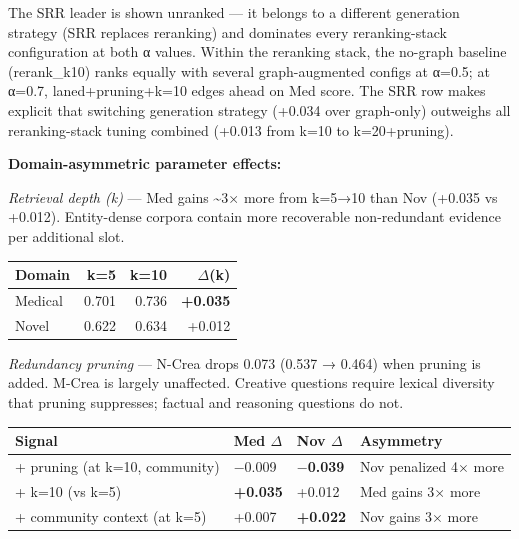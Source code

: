 \documentclass[
]{article}
\begin{document}
The SRR leader is shown unranked --- it belongs to a different
generation strategy (SRR replaces reranking) and dominates every
reranking-stack configuration at both α values. Within the reranking
stack, the no-graph baseline (rerank\_k10) ranks equally with several
graph-augmented configs at α=0.5; at α=0.7, laned+pruning+k=10 edges
ahead on Med score. The SRR row makes explicit that switching generation
strategy (+0.034 over graph-only) outweighs all reranking-stack tuning
combined (+0.013 from k=10 to k=20+pruning).

\textbf{Domain-asymmetric parameter effects:}

\emph{Retrieval depth (k)} --- Med gains \textasciitilde3× more from
k=5→10 than Nov (+0.035 vs +0.012). Entity-dense corpora contain more
recoverable non-redundant evidence per additional slot.

\begin{small}
\setlength{\tabcolsep}{4pt}
\begin{longtable}{p{1.2in}rrr}
\toprule
\textbf{Domain} & \textbf{k=5} & \textbf{k=10} & \textbf{$\Delta$(k)} \\
\midrule
\endhead
Medical & 0.701 & 0.736 & \textbf{+0.035} \\
Novel & 0.622 & 0.634 & +0.012 \\
\bottomrule
\end{longtable}
\end{small}

\emph{Redundancy pruning} --- N-Crea drops 0.073 (0.537 → 0.464) when
pruning is added. M-Crea is largely unaffected. Creative questions
require lexical diversity that pruning suppresses; factual and reasoning
questions do not.

\begin{small}
\setlength{\tabcolsep}{4pt}
\begin{longtable}{p{2.2in}p{0.8in}p{0.8in}p{2.0in}}
\toprule
\textbf{Signal} & \textbf{Med $\Delta$} & \textbf{Nov $\Delta$} & \textbf{Asymmetry} \\
\midrule
\endhead
+ pruning (at k=10, community) & $-$0.009 & \textbf{$-$0.039} & Nov penalized 4$\times$ more \\
+ k=10 (vs k=5) & \textbf{+0.035} & +0.012 & Med gains 3$\times$ more \\
+ community context (at k=5) & +0.007 & \textbf{+0.022} & Nov gains 3$\times$ more \\
\bottomrule
\end{longtable}
\end{small}
\end{document}
